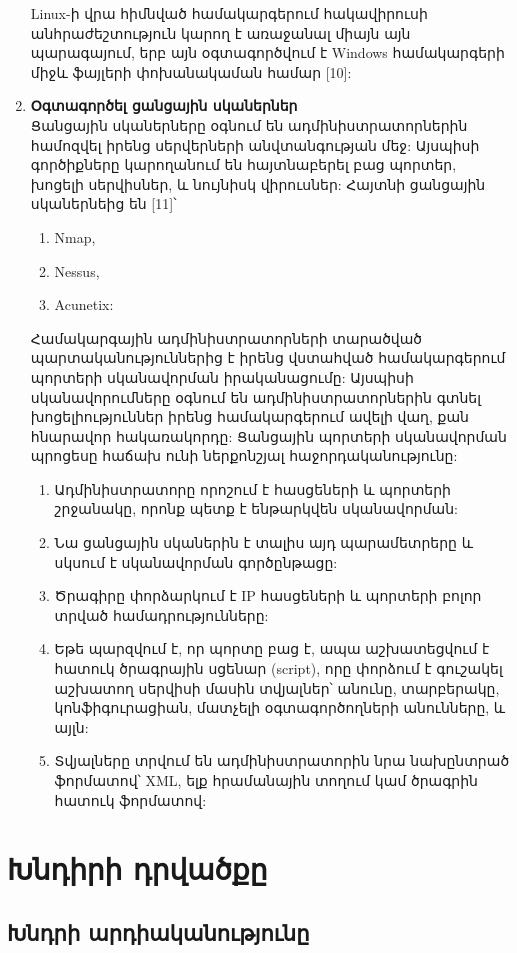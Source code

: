 \documentclass[a4paper,12pt]{article}
\begin{document}
\begin{sloppypar}
\begin{enumerate}
	Linux-ի վրա հիմնված համակարգերում հակավիրուսի անհրաժեշտություն կարող է
	առաջանալ միայն այն պարագայում, երբ այն օգտագործվում է Windows համակարգերի
	միջև ֆայլերի փոխանակաման համար [10]:
\item \textbf{Օգտագործել ցանցային սկաներներ}\\
    Ցանցային սկաներները օգնում են ադմինիստրատորներին համոզվել իրենց
    սերվերների անվտանգության մեջ: Այսպիսի գործիքները կարողանում են
    հայտնաբերել բաց պորտեր, խոցելի սերվիսներ, և նույնիսկ վիրուսներ:
    Հայտնի ցանցային սկաներնեից են [11]՝
    \begin{enumerate}
        \item Nmap,
        \item Nessus,
        \item Acunetix:
    \end{enumerate}
	Համակարգային ադմինիստրատորների տարածված պարտականություններից է իրենց
	վստահված համակարգերում պորտերի սկանավորման իրականացումը:
	Այսպիսի սկանավորումները օգնում են ադմինիստրատորներին գտնել խոցելիություններ
	իրենց համակարգերում ավելի վաղ, քան հնարավոր հակառակորդը:
	Ցանցային պորտերի սկանավորման պրոցեսը հաճախ ունի ներքոնշյալ հաջորդականությունը:

	\begin{enumerate}
	\item Ադմինիստրատորը որոշում է հասցեների և պորտերի շրջանակը, որոնք պետք է
		ենթարկվեն սկանավորման:
	\item Նա ցանցային սկաներին է տալիս այդ պարամետրերը և սկսում է
		սկանավորման գործընթացը:
	\item Ծրագիրը փորձարկում է IP հասցեների և պորտերի բոլոր տրված
		համադրությունները:
	\item Եթե պարզվում է, որ պորտը բաց է, ապա աշխատեցվում է հատուկ ծրագրային
		սցենար (script), որը փորձում է գուշակել աշխատող սերվիսի մասին տվյալներ՝
		անունը, տարբերակը, կոնֆիգուրացիան, մատչելի օգտագործողների անունները,
		և այլն:
	\item Տվյալները տրվում են ադմինիստրատորին նրա նախընտրած ֆորմատով՝
		XML, ելք հրամանային տողում կամ ծրագրին հատուկ ֆորմատով:
	\end{enumerate}
\end{enumerate}


\section{Խնդիրի դրվածքը}


\subsection{Խնդրի արդիականությունը}



\end{sloppypar}
\end{document}
